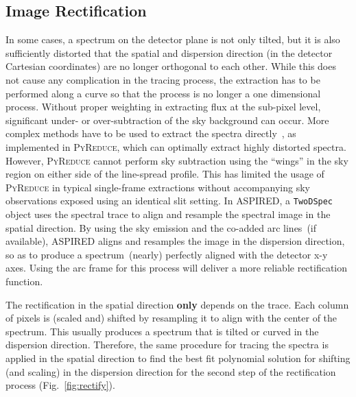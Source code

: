 \documentclass[linenumbers, twocolumn]{aastex631}
\begin{document}
\subsection{Image Rectification}
In some cases, a spectrum on the detector plane is not only tilted, but it is
also sufficiently distorted that the spatial and dispersion direction (in the
detector Cartesian coordinates) are no longer orthogonal to each other. While
this does not cause any complication in the tracing process, the extraction has
to be performed along a curve so that the process is no longer a one dimensional
process. Without proper weighting in extracting flux at the sub-pixel level,
significant under- or over-subtraction of the sky background can occur. More
complex methods have to be used to extract the spectra
directly~\citep[e.g.][]{2021A&A...646A..32P}, as implemented in
\textsc{PyReduce}, which can optimally extract highly distorted spectra.
However, \textsc{PyReduce} cannot perform sky subtraction using the ``wings'' in the sky
region on either side of the line-spread profile. This has limited the usage
of \textsc{PyReduce} in typical single-frame extractions without accompanying sky observations
exposed using an identical slit setting. In \textsc{ASPIRED}, a
\texttt{TwoDSpec} object uses the spectral trace to align and resample the
spectral image in the spatial direction. By using the sky emission and the
co-added arc lines~(if available), \textsc{ASPIRED} aligns and resamples the image in the
dispersion direction, so as to produce a spectrum~(nearly)
perfectly aligned with the detector x-y axes. Using the arc frame for this
process will deliver a more reliable rectification function.

The rectification in the spatial direction \textbf{only} depends on the trace.
Each column of pixels is (scaled and) shifted by resampling it to align with the
center of the spectrum. This usually produces a spectrum that is tilted or curved
in the dispersion direction. Therefore, the same procedure for tracing the
spectra is applied in the spatial direction to find the best fit polynomial
solution for shifting (and scaling) in the dispersion direction for the second
step of the rectification process (Fig.~\ref{fig:rectify}).
\end{document}
